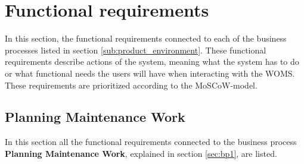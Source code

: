 \section{Functional requirements}
\label{sec:functional_requirements}

In this section, the functional requirements connected to each of the business processes listed in section \ref{sub:product_environment}. These functional requirements describe actions of the system, meaning what the system has to do or what functional needs the users will have when interacting with the WOMS. These requirements are prioritized according to the MoSCoW-model. 

\subsection{Planning Maintenance Work}
\label{sub:planning_maintenance_work}
In this section all the functional requirements connected to the business process \textbf{Planning Maintenance Work}, explained in section \ref{sec:bp1}, are listed.

